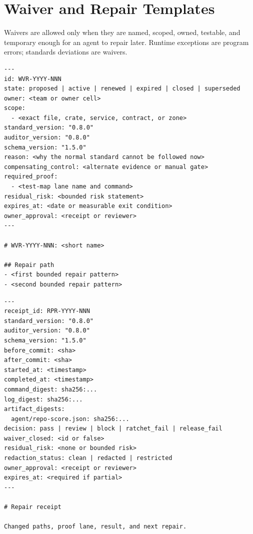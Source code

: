 \section{Waiver and Repair Templates}

Waivers are allowed only when they are named, scoped, owned, testable, and temporary enough for an agent to repair later. Runtime exceptions are program errors; standards deviations are waivers.

\begin{lstlisting}[style=codebox]
---
id: WVR-YYYY-NNN
state: proposed | active | renewed | expired | closed | superseded
owner: <team or owner cell>
scope:
  - <exact file, crate, service, contract, or zone>
standard_version: "0.8.0"
auditor_version: "0.8.0"
schema_version: "1.5.0"
reason: <why the normal standard cannot be followed now>
compensating_control: <alternate evidence or manual gate>
required_proof:
  - <test-map lane name and command>
residual_risk: <bounded risk statement>
expires_at: <date or measurable exit condition>
owner_approval: <receipt or reviewer>
---

# WVR-YYYY-NNN: <short name>

## Repair path
- <first bounded repair pattern>
- <second bounded repair pattern>
\end{lstlisting}

\begin{lstlisting}[style=codebox]
---
receipt_id: RPR-YYYY-NNN
standard_version: "0.8.0"
auditor_version: "0.8.0"
schema_version: "1.5.0"
before_commit: <sha>
after_commit: <sha>
started_at: <timestamp>
completed_at: <timestamp>
command_digest: sha256:...
log_digest: sha256:...
artifact_digests:
  agent/repo-score.json: sha256:...
decision: pass | review | block | ratchet_fail | release_fail
waiver_closed: <id or false>
residual_risk: <none or bounded risk>
redaction_status: clean | redacted | restricted
owner_approval: <receipt or reviewer>
expires_at: <required if partial>
---

# Repair receipt

Changed paths, proof lane, result, and next repair.
\end{lstlisting}
